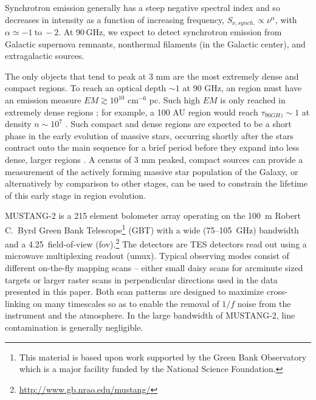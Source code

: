 \documentclass[twocolumn]{aastex62}
\newcommand{\MUSTANG}{MUSTANG-2\xspace}
\begin{document}
Synchrotron emission generally has a steep negative spectral index and so
decreases in intensity as a function of increasing frequency, $S_{\nu,
synch.}\propto \nu^{\alpha}$, with $\alpha\simeq -1 \mathrm{~to~} -2$.  At 90\,GHz, we expect
to detect synchrotron emission from Galactic supernova remnants, nonthermal
filaments (in the Galactic center), and extragalactic sources.

The only objects that tend to peak at 3 mm are the most extremely dense and
compact \hii regions.  To reach an optical depth $\sim1$ at 90 GHz, an \hii
region must have an emission measure $EM\gtrsim10^{10}$ cm$^{-6}$ pc.  Such high $EM$ is
only reached in extremely dense regions \citep[e.g.][]{Galvan-Madrid2009a}; for example, a 100 AU \hii region
would reach $\tau_{90 GHz}\sim1$ at density $n\sim10^7$ \percc
\citep[][]{Wilson2009a,Condon2016a}.  Such compact and dense \hii regions are
expected to be a short phase in the early evolution of massive stars, occurring
shortly after the stars contract onto the main sequence for a brief period
before they expand into less dense, larger \hii regions \citep{Wood1989b}.  A
census of 3 mm peaked, compact sources can provide a measurement of the
actively forming massive star population of the Galaxy, or alternatively by
comparison to other stages, can be used to constrain the lifetime of this early
stage in \hii region evolution.


\MUSTANG \citep{Dicker2014a} is a 215 element bolometer array operating on the
100~m Robert C.\ Byrd Green Bank Telescope\footnote{This material is
based upon work supported by the Green Bank Observatory which is a major
facility funded by the National Science Foundation.} (GBT) with a wide
(75--105~GHz) bandwidth and a 4.25\arcmin\ field-of-view
(fov).\footnote{\url{http://www.gb.nrao.edu/mustang/}}  The detectors are TES
detectors read out using a microwave multiplexing readout (umux). Typical
observing modes consist of different on-the-fly mapping scans -- either small
daisy scans for arcminute sized targets or larger raster scans in perpendicular
directions used in the data presented in this paper.  Both scan patterns are
designed to maximize cross-linking on many timescales so as to enable the
removal of $1/f$ noise from the instrument and the atmosphere.  In the large
bandwidth of \MUSTANG, line contamination is generally negligible.
\end{document}
